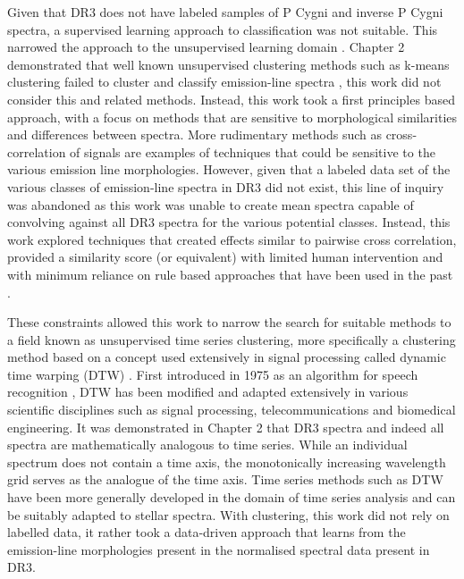 Given that DR3 does not have labeled samples of P Cygni and inverse P Cygni spectra, a supervised learning approach to classification was not suitable. This narrowed the approach to the unsupervised learning domain \cite{hastie2009elements}. Chapter 2 demonstrated that well known unsupervised clustering methods such as k-means clustering failed to cluster and classify emission-line spectra \cite{garcia2018machine}, this work did not consider this and related methods. Instead, this work took a first principles based approach, with a focus on methods that are sensitive to morphological similarities and differences between spectra. More rudimentary methods such as cross-correlation of signals are examples of techniques that could be sensitive to the various emission line morphologies. However, given that a labeled data set of the various classes of emission-line spectra in DR3 did not exist, this line of inquiry was abandoned as this work was unable to create mean spectra capable of convolving against all DR3 spectra for the various potential classes. Instead, this work explored techniques that created effects similar to pairwise cross correlation, provided a similarity score (or equivalent) with limited human intervention and with minimum reliance on rule based approaches that have been used in the past \cite{traven2015gaia}. 

These constraints allowed this work to narrow the search for suitable methods to a field known as unsupervised time series clustering, more specifically a clustering method based on a concept used extensively in signal processing called dynamic time warping (DTW) \cite{kruskal1983overview}. First introduced in 1975 as an algorithm for speech recognition \cite{itakura1975minimum}, DTW has been modified and adapted extensively in various scientific disciplines such as signal processing, telecommunications and biomedical engineering. It was demonstrated in Chapter 2 that DR3 spectra and indeed all spectra are mathematically analogous to time series. While an individual spectrum does not contain a time axis, the monotonically increasing wavelength grid serves as the analogue of the time axis. Time series methods such as DTW have been more generally developed in the domain of time series analysis \cite{nielsen2019practical} and can be suitably adapted to stellar spectra. With clustering, this work did not rely on labelled data, it rather took a data-driven approach that learns from the emission-line morphologies present in the normalised spectral data present in DR3.


